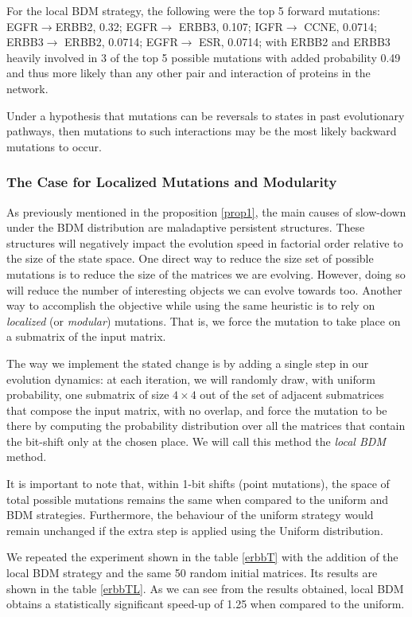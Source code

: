 \documentclass[10pt]{article}
\begin{document}
For the local BDM strategy, the following were the top 5 forward mutations: EGFR$\rightarrow$ERBB2, 0.32; EGFR$\rightarrow$
   ERBB3, 0.107; IGFR$\rightarrow$
   CCNE, 0.0714; ERBB3$\rightarrow$
   ERBB2, 0.0714; EGFR$\rightarrow$
   ESR, 0.0714; with ERBB2 and ERBB3 heavily involved in 3 of the top 5 possible mutations with added probability 0.49 and thus more likely than any other pair and interaction of proteins in the network.

Under a hypothesis that mutations can be reversals to states in past evolutionary pathways, then mutations to such interactions may be the most likely backward mutations to occur.


\subsubsection{The Case for Localized Mutations and Modularity}\label{modularity}

As previously mentioned in the proposition \ref{prop1}, the main causes of slow-down under the BDM distribution are maladaptive persistent structures. These structures will negatively impact the evolution speed in factorial order relative to the size of the state space. One direct way to reduce the size set of possible mutations is to reduce the size of the matrices we are evolving. However, doing so will reduce the number of interesting objects we can evolve towards too. Another way to accomplish the objective while using the same heuristic is to rely on \textit{localized} (or \textit{modular}) mutations. That is, we force the mutation to take place on a submatrix of the input matrix.

The way we implement the stated change is by adding a single step in our evolution dynamics: at each iteration, we will randomly draw, with uniform probability, one submatrix of size $4 \times 4$ out of the set of adjacent submatrices that compose the input matrix, with no overlap, and force the mutation to be there by computing the probability distribution over all the matrices that contain the bit-shift only at the chosen place. We will call this method the \emph{local BDM} method.

It is important to note that, within 1-bit shifts (point mutations), the space of total possible mutations remains the same when compared to the uniform and BDM strategies. Furthermore, the behaviour of the uniform strategy would remain unchanged if the extra step is applied using the Uniform distribution.

We repeated the experiment shown in the table \ref{erbbT} with the addition of the local BDM strategy and the same 50 random initial matrices. Its results are shown in the table \ref{erbbTL}. As we can see from the results obtained, local BDM obtains a statistically significant speed-up of 1.25 when compared to the uniform.
\end{document}
